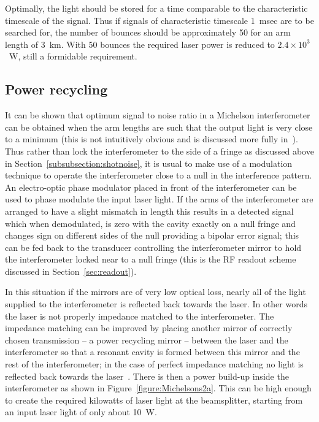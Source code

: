\documentclass{article}
\begin{document}
Optimally, the light should be stored for a time comparable to the
characteristic timescale of the signal. Thus if signals of characteristic
timescale 1~msec are to be searched for, the number of bounces should be
approximately 50 for an arm length of 3~km. With 50 bounces the required laser
power is reduced to $2.4 \times 10^3$~W, still a formidable requirement.



\subsection{Power recycling}
\label{subsection:powerrec}

It can be shown that optimum signal to noise ratio in a Michelson interferometer
can be obtained when the arm lengths are such that the output light is very
close to a minimum (this is not intuitively obvious and is discussed more fully
in~\cite{Edelstein}). Thus rather than lock the interferometer to the side of a
fringe as discussed above in Section~\ref{subsubsection:shotnoise}, it is usual
to make use of a modulation technique to operate the interferometer close to a
null in the interference pattern. An electro-optic phase modulator placed in
front of the interferometer can be used to phase modulate the input laser light.
If the arms of the interferometer are arranged to have a slight mismatch in
length this results in a detected signal which when demodulated, is zero with
the cavity exactly on a null fringe and changes sign on different sides of the
null providing a bipolar error signal; this can be fed back to the transducer
controlling the interferometer mirror to hold the interferometer locked near to
a null fringe (this is the RF readout scheme discussed in Section~\ref{sec:readout}).

In this situation if the mirrors are of very low optical loss, nearly all of the
light supplied to the interferometer is reflected back towards the laser. In
other words the laser is not properly impedance matched to the interferometer.
The impedance matching can be improved by placing another mirror of correctly
chosen transmission -- a power recycling mirror -- between the laser and the
interferometer so that a resonant cavity is formed between this mirror and the
rest of the interferometer; in the case of perfect impedance matching no light
is reflected back towards the laser~\cite{Drever3, Schilling}. There is then a
power build-up inside the interferometer as shown in 
Figure~\ref{figure:Michelsons2a}. This can be high enough to create the required
kilowatts of laser light at the beamsplitter, starting from an input laser light
of only about 10~W.
\end{document}

